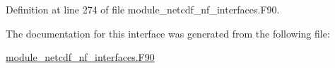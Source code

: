 Definition at line 274 of file module\+\_\+netcdf\+\_\+nf\+\_\+interfaces.\+F90.



The documentation for this interface was generated from the following file\+:\begin{DoxyCompactItemize}
\item 
\hyperlink{module__netcdf__nf__interfaces_8F90}{module\+\_\+netcdf\+\_\+nf\+\_\+interfaces.\+F90}\end{DoxyCompactItemize}
